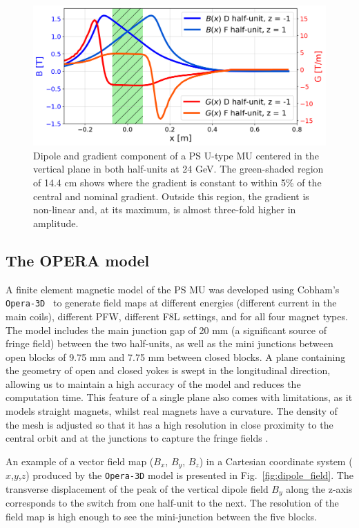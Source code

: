 \documentclass[a4paper,
               biblatex,     %
               keeplastbox,   %
               ]{jacow}
\begin{document}
\begin{figure}[!htb]
   \centering
   \includegraphics*[width=1.0\columnwidth, trim={0 0 0 0cm},clip]{Main_field_B_G_with_mask.png}
   \caption{Dipole and gradient component of a  PS U-type MU centered in the vertical plane in both half-units at 24 GeV. The green-shaded region of 14.4 cm shows where the gradient is constant to within 5\% of the central and nominal gradient. Outside this region, the gradient is non-linear and, at its maximum, is almost three-fold higher in amplitude.}
   \label{fig:gradient_field}
\end{figure}

\subsection{The OPERA model}
A finite element magnetic model of the PS MU was developed using Cobham's \texttt{Opera-3D}~\cite{noauthor_opera_nodate, anglada_pxmu_hrcwp_nodate} to generate field maps at different energies (different current in the main coils), different PFW, different F8L settings, and for all four magnet types. The model includes the main junction gap of 20 mm (a significant source of fringe field) between the two half-units, as well as the mini junctions between open blocks of 9.75 mm and 7.75 mm between closed blocks. A plane containing the geometry of open and closed yokes is swept in the longitudinal direction, allowing us to maintain a high accuracy of the model and reduces the computation time. This feature of a single plane also comes with limitations, as it models straight magnets, whilst real magnets have a curvature. The density of the mesh is adjusted so that it has a high resolution in close proximity to the central orbit and at the junctions to capture the fringe fields \cite{anglada_reference_2019}.

An example of a vector field map ($B_x$, $B_y$, $B_z$) in a Cartesian coordinate system ($x$,$y$,$z$) produced by the \texttt{Opera-3D} model is presented in Fig.~\ref{fig:dipole_field}. The transverse displacement of the peak of the vertical dipole field $B_{y}$ along the z-axis corresponds to the switch from one half-unit to the next. The resolution of the field map is high enough to see the mini-junction between the five blocks.
\end{document}
